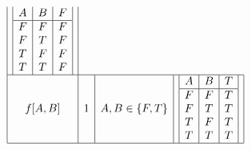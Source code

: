 \documentclass[11pt]{article}
\begin{document}
\[\begin{array}{|c|c|c|c|}
\begin{array}{|c|c|c|}
A & B & F \\
\hline
F & F & F \\
F & T & F \\
T & F & F \\
T & T & F \\
\end{array} \\
\hline
f[A, B] & 1 & A, B \in \{F, T\} & \begin{array}{|c|c|c|}
A & B & T \\
\hline
F & F & T \\
F & T & T \\
T & F & T \\
T & T & T \\
\end{array} \\
\hline
\end{array}
\]


\newpage
\end{document}
